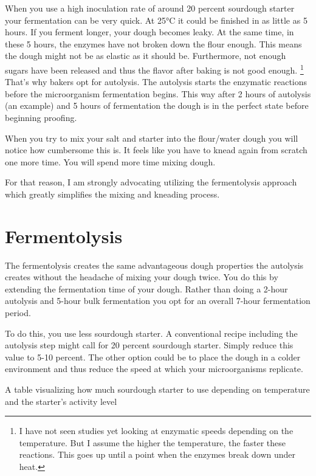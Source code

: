 When you use a high inoculation rate of around 20 percent sourdough starter
your fermentation can be very quick. At 25°C it could be finished in as little as 5 hours.
If you ferment longer, your dough becomes leaky. At the same time, in
these 5 hours, the enzymes have not broken down the flour enough. This means
the dough might not be as elastic as it should be. Furthermore, not enough
sugars have been released and thus the flavor after baking is not good enough.
\footnote{I have not seen studies yet looking at enzymatic speeds depending on
the temperature. But I assume the higher the temperature, the faster these
reactions. This goes up until a point when the enzymes break down under
heat.} That's why bakers opt for autolysis. The autolysis starts the enzymatic
reactions before the microorganism fermentation begins. This way after 2 hours
of autolysis (an example) and 5 hours of fermentation the dough is in the
perfect state before beginning proofing.

When you try to mix your salt and starter into the flour/water dough you will
notice how cumbersome this is. It feels like you have to knead again from scratch
one more time. You will spend more time mixing dough.

For that reason, I am strongly advocating utilizing the fermentolysis approach
which greatly simplifies the mixing and kneading process.

\section{Fermentolysis}
\label{section:fermentolysis}

The fermentolysis creates the same advantageous dough properties the
autolysis creates without the headache of mixing your dough twice. You do this
by extending the fermentation time of your dough. Rather than doing a 2-hour
autolysis and 5-hour bulk fermentation you opt for an overall 7-hour
fermentation period.

To do this, you use less sourdough starter. A conventional recipe including the
autolysis step might call for 20 percent sourdough starter. Simply reduce this
value to 5-10 percent. The other option could be to place the dough in a colder
environment and thus reduce the speed at which your microorganisms replicate.

\begin{table}[!htb]
    \begin{center}
        
        \caption{A table visualizing how much sourdough starter to use
        depending on temperature and the starter's activity level}
    \end{center}
\end{table}

